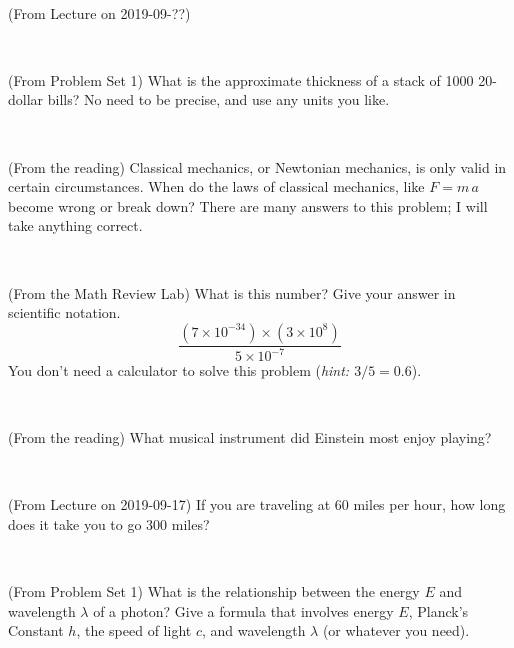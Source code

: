 \documentclass[12pt, letterpaper]{article}
\begin{document}
\vfill ~

\begin{problem} (From Lecture on 2019-09-??)
\end{problem}


\vfill ~

\begin{problem} (From Problem Set 1)
What is the approximate thickness of a stack of 1000 20-dollar bills?
No need to be precise, and use any units you like.
\end{problem}


\vfill ~

\begin{problem} (From the reading)
Classical mechanics, or Newtonian mechanics, is only valid in certain
circumstances. When do the laws of classical mechanics, like $F =
m\,a$ become wrong or break down? There are many answers to this
problem; I will take anything correct.
\end{problem}


\vfill ~


\clearpage


\begin{problem} (From the Math Review Lab)
What is this number? Give your answer in scientific notation.
$$
\frac{(7\times10^{-34})\times(3\times10^8)}{5\times10^{-7}}
$$
You don't need a calculator to solve this problem (\textit{hint: $3/5=0.6$}).
\end{problem}


\vfill ~

\begin{problem} (From the reading)
What musical instrument did Einstein most enjoy playing?
\end{problem}


\vfill ~

\begin{problem} (From Lecture on 2019-09-17)
If you are traveling at 60 miles per hour, how long does
it take you to go 300 miles?
\end{problem}


\vfill ~

\begin{problem} (From Problem Set 1)
What is the relationship between the energy $E$ and wavelength
$\lambda$ of a photon? Give a formula that involves energy $E$,
Planck's Constant $h$, the speed of light $c$, and wavelength
$\lambda$ (or whatever you need).
\end{problem}

\vfill ~
\end{document}
